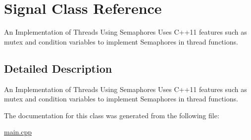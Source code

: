 \hypertarget{class_signal}{}\section{Signal Class Reference}
\label{class_signal}


An Implementation of Threads Using Semaphores Uses C++11 features such as mutex and condition variables to implement Semaphores in thread functions.  




\subsection{Detailed Description}
An Implementation of Threads Using Semaphores Uses C++11 features such as mutex and condition variables to implement Semaphores in thread functions. 

The documentation for this class was generated from the following file\+:\begin{DoxyCompactItemize}
\item 
\hyperlink{main_8cpp}{main.\+cpp}\end{DoxyCompactItemize}
